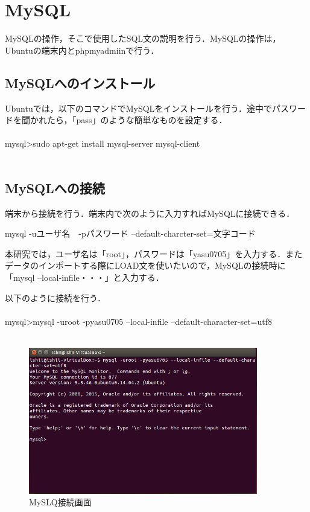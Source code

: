 \section{MySQL}

MySQLの操作，そこで使用したSQL文の説明を行う．MySQLの操作は，Ubuntuの端末内とphpmyadmiinで行う．

\subsection{MySQLへのインストール}

Ubuntuでは，以下のコマンドでMySQLをインストールを行う．途中でパスワードを聞かれたら，「pass」のような簡単なものを設定する．
\\
\\
mysql>sudo apt-get install mysql-server mysql-client
\\
\\
\subsection{MySQLへの接続}

端末から接続を行う．端末内で次のように入力すればMySQLに接続できる．

mysql -uユーザ名　-pパスワード --default-charcter-set=文字コード

本研究では，ユーザ名は「root」，パスワードは「yasu0705」を入力する．またデータのインポートする際にLOAD文を使いたいので，MySQLの接続時に「mysql --local-infile・・・」と入力する．

以下のように接続を行う．
\\
\\
mysql>mysql -uroot -pyasu0705 --local-infile --default-character-set=utf8
\\
\\

\begin{figure}[H]
\centering
\includegraphics[width=10cm]{MySQL_connection.png}
\caption{MySLQ接続画面}\label{サンプル図}
\end{figure}




